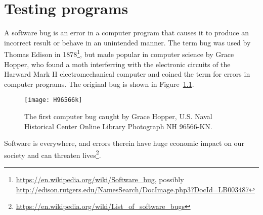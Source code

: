 \chapter{Testing programs}

A software bug is an error in a computer program that causes it to produce an incorrect result or behave in an unintended manner. The term bug was used by Thomas Edison in 1878\footnote{\url{https://en.wikipedia.org/wiki/Software_bug}, possibly \url{http://edison.rutgers.edu/NamesSearch/DocImage.php3?DocId=LB003487}}, but made popular in computer science by Grace Hopper, who found a moth interferring with the electronic circuits of the Harward Mark II electromechanical computer and coined the term  for errors in computer programs. The original bug is shown in Figure~\ref{fig:bug}.
\begin{figure}
  \centering
  \texttt{[image: H96566k]}
  \caption{The first computer bug caught by Grace Hopper, U.S. Naval Historical Center Online Library Photograph NH 96566-KN.}
  \label{fig:bug}
\end{figure}
Software is everywhere, and errors therein have huge economic impact on our society and can threaten lives\footnote{\url{https://en.wikipedia.org/wiki/List_of_software_bugs}}.

